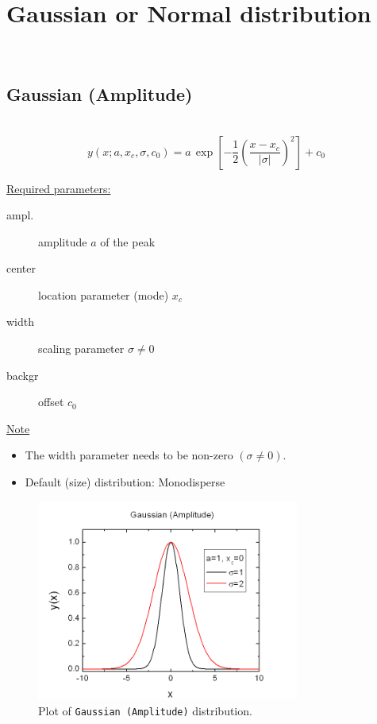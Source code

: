 \clearpage

\section{Gaussian or Normal distribution} ~\\
\label{sec:GaussianNormal}
\subsection{Gaussian (Amplitude)} \hspace{1pt} \\
\label{sec:GaussianNormalAmplitude}
\begin{equation}
y(x;a,x_c,\sigma,c_0) = a \,
\exp\left[-\frac{1}{2}\left(\frac{x-x_c}{|\sigma|}\right)^2\right]
+c_0
\end{equation}
\vspace{5mm}

\underline{Required parameters:}
\begin{description}
    \item[ampl.] amplitude $a$ of the peak
    \item[center] location parameter (mode) $x_c$
    \item[width] scaling parameter $\sigma\neq 0$
    \item[backgr] offset $c_0$
\end{description}

\underline{Note}
\begin{itemize}
  \item The width parameter needs to be non-zero $(\sigma\neq 0)$.
  \item Default (size) distribution: Monodisperse
\end{itemize}
\begin{figure}[htb]
\begin{center}
\includegraphics[width=0.768\textwidth]{GaussianAmplitude.png}
\end{center}
\caption{Plot of \texttt{Gaussian (Amplitude)} distribution.}
\label{fig:GaussianAmplitude}
\end{figure}

